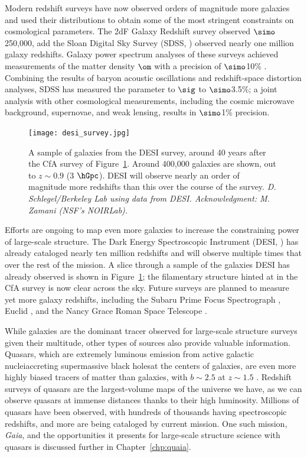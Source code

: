 Modern redshift surveys have now observed orders of magnitude more galaxies and used their distributions to obtain some of the most stringent constraints on cosmological parameters.
The 2dF Galaxy Redshift survey \citep{Colless2001} observed $\simo$250,000, add the Sloan Digital Sky Survey (SDSS, \citealt{York2000}) observed nearly one million galaxy redshifts.
Galaxy power spectrum analyses of these surveys achieved measurements of the matter density ${\om}$ with a precision of $\simo$10\% \citep{cole_2df_2005, tegmark_cosmological_2006}.
Combining the results of baryon acoustic oscillations and redshift-space distortion analyses, SDSS has measured the parameter to $\sig$ to $\simo$3.5\%; a joint analysis with other cosmological measurements, including the cosmic microwave background, supernovae, and weak lensing, results in $\simo$1\% precision.

\begin{figure}
    \centering
    \texttt{[image: desi\_survey.jpg]}
    \caption{A sample of galaxies from the DESI survey, around 40 years after the CfA survey of Figure~\ref{fig:desi_survey}. Around 400,000 galaxies are shown, out to $z \sim 0.9$ (3 $\hGpc$). DESI will observe nearly an order of magnitude more redshifts than this over the course of the survey. \emph{D. Schlegel/Berkeley Lab using data from DESI. Acknowledgment: M. Zamani (NSF's NOIRLab).}}
    \label{fig:desi_survey}
\end{figure}

Efforts are ongoing to map even more galaxies to increase the constraining power of large-scale structure.
The Dark Energy Spectroscopic Instrument (DESI, \citealt{Aghamousa2016}) has already cataloged nearly ten million redshifts and will observe multiple times that over the rest of the mission.
A slice through a sample of the galaxies DESI has already observed is shown in Figure~\ref{fig:desi_survey}; the filamentary structure hinted at in the CfA survey is now clear across the sky.
Future surveys are planned to measure yet more galaxy redshifts, including the Subaru Prime Focus Spectrograph \citep{takada_extragalactic_2014}, Euclid \citep{Laureijs2011}, and the Nancy Grace Roman Space Telescope \citep{Green2012}.

While galaxies are the dominant tracer observed for large-scale structure surveys given their multitude, other types of sources also provide valuable information.
Quasars, which are extremely luminous emission from active galactic nuclei{\emdash}accreting supermassive black holes{\emdash}at the centers of galaxies, are even more highly biased tracers of matter than galaxies, with $b \sim 2.5$ at $z \sim 1.5$ \citep{laurent_clustering_2017-3}.
Redshift surveys of quasars are the largest-volume maps of the universe we have, as we can observe quasars at immense distances thanks to their high luminosity.
Millions of quasars have been observed, with hundreds of thousands having spectroscopic redshifts, and more are being cataloged by current mission.
One such mission, \emph{Gaia}, and the opportunities it presents for large-scale structure science with quasars is discussed further in Chapter~\ref{chp:quaia}.



